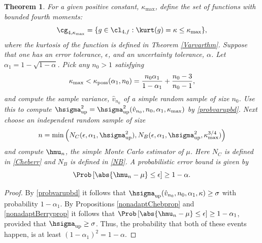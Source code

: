 \documentclass[12pt]{amsart}
\newcommand{\hv}{\hat{v}}
\newtheorem{theorem}{Theorem}
\begin{document}
\begin{theorem} \label{mainadaptthm} For a given positive constant, $\kappa_{\max}$, define the set of functions with bounded fourth moments:
\[
\cg_{4,\kappa_{\max}}= \{g \in \cl_{4,f} : \kurt(g)= \kappa \le \kappa_{\max} \},
\]
where the kurtosis of the function is defined in Theorem \ref{Varvarthm}.
Suppose that one has an error tolerance, $\epsilon$, and an uncertainty tolerance, $\alpha$. Let $\alpha_1 = 1 - \sqrt{1 - \alpha}$.  Pick any $n_0>1$ satisfying
\[
\kappa_{\max} < \kappa_{\text{\rm poss}}(\alpha_1,n_0)  = \frac{n_0 \alpha_1}{1-\alpha_1} + \frac{n_0-3}{n_0-1},
\]
and compute the sample variance, $\hv_{n_0}$ of a simple random sample of size $n_0$.   Use this to compute $\hsigma^2_{\text{\rm up}} = \hsigma^2_{\text{\rm up}}(\hv_{n_0},n_0,\alpha_1,\kappa_{\max})$ by \eqref{probvarupbd}.  Next choose an independent random sample of size
\[
n = \min\left( N_C(\epsilon,\alpha_1,\hsigma^2_{\text{\rm up}}), N_B(\epsilon,\alpha_1,\hsigma^2_{\text{\rm up}},\kappa_{\max}^{3/4}) \right)
\]
and compute $\hmu_n$, the simple Monte Carlo estimator of $\mu$.  Here $N_C$ is defined in \eqref{Cheberr} and  $N_B$ is defined in \eqref{NB}.  A probabilistic error bound is given by
\[
\Prob\left[\abs{\hmu_n-\mu} \le \epsilon \right] \geq 1-\alpha.
\]
\end{theorem}
\begin{proof}
By \eqref{probvarupbd} it follows that $\hsigma_{\text{up}}(\hv_{n_0},n_0,\alpha_1,\kappa)  \ge \sigma$ with probability $1-\alpha_1$.  By Propositions  \ref{nonadaptChebprop} and \ref{nonadaptBerryprop} it follows that  $\Prob\left[\abs{\hmu_n-\mu} \le \epsilon \right] \geq 1-\alpha_1$, provided that $\hsigma_{\text{up}}  \ge \sigma$.  Thus, the probability that both of these events happen, is at least $(1-\alpha_1)^2=1-\alpha$.
\end{proof}
\end{document}
